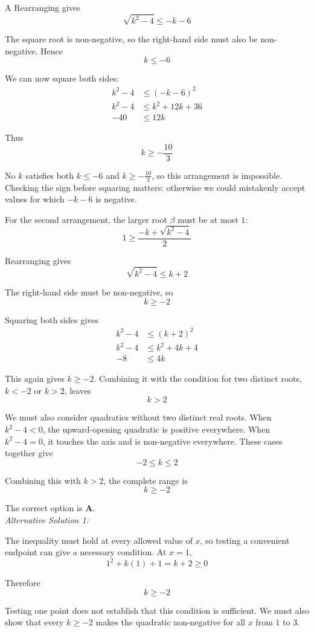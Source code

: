 \documentclass[11pt,a4paper]{article}
\begin{document}
\begin{enumerate}[label=\textbf{\arabic*.},leftmargin=*,itemsep=0pt,start=10]
\begin{djsSolution}{A}
Rearranging gives
\[
\sqrt{k^2-4}\le-k-6
\]

The square root is non-negative, so the right-hand side must also be non-negative. Hence
\[
k\le-6
\]

We can now square both sides:
\[
\begin{aligned}
k^2-4&\le(-k-6)^2\\[5pt]
k^2-4&\le k^2+12k+36\\[5pt]
-40&\le12k
\end{aligned}
\]

Thus
\[
k\ge-\frac{10}{3}
\]

No $k$ satisfies both $k\le-6$ and $k\ge-\frac{10}{3}$, so this arrangement is impossible. Checking the sign before squaring matters: otherwise we could mistakenly accept values for which $-k-6$ is negative.

For the second arrangement, the larger root $\beta$ must be at most $1$:
\[
1\ge\frac{-k+\sqrt{k^2-4}}2
\]

Rearranging gives
\[
\sqrt{k^2-4}\le k+2
\]

The right-hand side must be non-negative, so
\[
k\ge-2
\]

Squaring both sides gives
\[
\begin{aligned}
k^2-4&\le(k+2)^2\\[5pt]
k^2-4&\le k^2+4k+4\\[5pt]
-8&\le4k
\end{aligned}
\]

This again gives $k\ge-2$. Combining it with the condition for two distinct roots, $k<-2$ or $k>2$, leaves
\[
k>2
\]

We must also consider quadratics without two distinct real roots. When $k^2-4<0$, the upward-opening quadratic is positive everywhere. When $k^2-4=0$, it touches the axis and is non-negative everywhere. These cases together give
\[
-2\le k\le2
\]

Combining this with $k>2$, the complete range is
\[
k\ge-2
\]

The correct option is \textbf{A}.\\[5pt]

\textit{Alternative Solution 1:}

The inequality must hold at every allowed value of $x$, so testing a convenient endpoint can give a necessary condition. At $x=1$,
\[
1^2+k(1)+1=k+2\ge0
\]

Therefore
\[
k\ge-2
\]

Testing one point does not establish that this condition is sufficient. We must also show that every $k\ge-2$ makes the quadratic non-negative for all $x$ from $1$ to $3$.


\end{djsSolution}
\end{enumerate}
\end{document}
